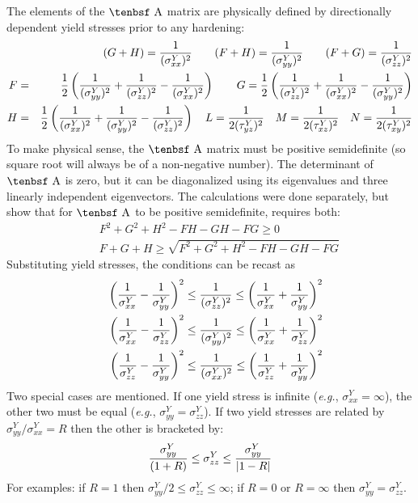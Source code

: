 \documentclass[11pt]{book}
\def\A{\hbox{\tenbsf A}}
\def\s#1{\sigma_{#1}}
\def\t#1{\tau_{#1}}
\begin{document}
The elements of the $\A$ matrix are physically defined by directionally dependent yield stresses prior to any hardening:
\begin{eqnarray}
       &&(G+H)  =  {1\over (\s{xx}^Y)^2}   \qquad
       (F+H)  =  {1\over (\s{yy}^Y)^2}  \qquad
       (F+G)  =  {1\over (\s{zz}^Y)^2} \\
        F & = & {1\over 2}\left( {1\over (\s{yy}^Y)^2} + {1\over (\s{zz}^Y)^2} - {1\over (\s{xx}^Y)^2}\right) \qquad
       G = {1\over 2}\left( {1\over (\s{zz}^Y)^2} + {1\over (\s{xx}^Y)^2} - {1\over (\s{yy}^Y)^2}\right) \\
       H & = & {1\over 2}\left( {1\over (\s{xx}^Y)^2} + {1\over (\s{yy}^Y)^2} - {1\over (\s{zz}^Y)^2}\right) \quad
       L = {1\over 2(\t{yz}^Y)^2} \quad M = {1\over 2(\t{xz}^Y)^2} \quad N = {1\over 2(\t{xy}^Y)^2}
\end{eqnarray}
To make physical sense, the $\A$ matrix must be positive semidefinite (so square root will always be of a non-negative number). The determinant of $\A$ is zero, but it can be diagonalized using its eigenvalues and three linearly independent eigenvectors. The calculations were done separately, but show that for $\A$ to be positive semidefinite, requires both:
\begin{eqnarray}
        &&F^2+G^2+H^2-FH-GH-FG \ge 0 \\
        &&F+G+H \ge \sqrt{F^2+G^2+H^2-FH-GH-FG}
\end{eqnarray}
Substituting yield stresses, the conditions can be recast as
\begin{eqnarray}
    && \left({1\over \s{xx}^Y}- {1\over \s{yy}^Y}\right)^2 \le {1\over (\s{zz}^Y)^2} \le \left({1\over \s{xx}^Y}+ {1\over \s{yy}^Y}\right)^2 \\
    && \left({1\over \s{xx}^Y}- {1\over \s{zz}^Y}\right)^2 \le {1\over (\s{yy}^Y)^2} \le \left({1\over \s{xx}^Y}+ {1\over \s{zz}^Y}\right)^2 \\
    && \left({1\over \s{zz}^Y}- {1\over \s{yy}^Y}\right)^2 \le {1\over (\s{xx}^Y)^2} \le \left({1\over \s{zz}^Y}+ {1\over \s{yy}^Y}\right)^2 
\end{eqnarray}
Two special cases are mentioned. If one yield stress is infinite ({\em e.g.}, $\s{xx}^Y=\infty$), the other two must be equal ({\em e.g.}, $\s{yy}^Y=\s{zz}^Y$).  If two yield stresses are related by $\s{yy}^Y/\s{xx}^Y=R$ then the other is bracketed by:
\begin{equation}
         { \s{yy}^Y \over (1+R)} \le   \s{zz}^Y   \le { \s{yy}^Y \over |1-R|} 
\end{equation}
For examples: if $R=1$ then $ \s{yy}^Y/2 \le \s{zz}^Y \le \infty$; if $R=0$ or $R=\infty$ then $ \s{yy}^Y= \s{zz}^Y$.
\end{document}
